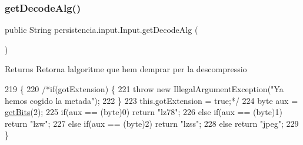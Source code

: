 \mbox{\label{classpersistencia_1_1input_1_1Input_a95e2068bd17e415f0487f8193f066160}} 
\subsubsection{\texorpdfstring{get\+Decode\+Alg()}{getDecodeAlg()}}
{\footnotesize\ttfamily public String persistencia.\+input.\+Input.\+get\+Decode\+Alg (\begin{DoxyParamCaption}{ }\end{DoxyParamCaption})\hspace{0.3cm}{\ttfamily [inline]}}

\begin{DoxyReturn}{Returns}
Retorna l\textquotesingle{}algoritme que hem d\textquotesingle{}emprar per la descompressio 
\end{DoxyReturn}

\begin{DoxyCode}
219     \{
220         \textcolor{comment}{/*if(gotExtension) \{}
221 \textcolor{comment}{            throw new IllegalArgumentException("Ya hemos cogido la metada");}
222 \textcolor{comment}{        \}}
223 \textcolor{comment}{        this.gotExtension = true;*/}
224         byte aux = \hyperlink{classpersistencia_1_1input_1_1Input_a3fa5a378b2155a3022a4a4ef38d63a8e}{getBits}(2);
225         \textcolor{keywordflow}{if}(aux == (byte)0) \textcolor{keywordflow}{return} \textcolor{stringliteral}{"lz78"};
226         \textcolor{keywordflow}{else} \textcolor{keywordflow}{if}(aux == (byte)1) \textcolor{keywordflow}{return} \textcolor{stringliteral}{"lzw"};
227         \textcolor{keywordflow}{else} \textcolor{keywordflow}{if}(aux == (byte)2) \textcolor{keywordflow}{return} \textcolor{stringliteral}{"lzss"};
228         \textcolor{keywordflow}{else} \textcolor{keywordflow}{return} \textcolor{stringliteral}{"jpeg"};
229     \}
\end{DoxyCode}
\mbox{\label{classpersistencia_1_1input_1_1Input_aa45459b94e501548a7b223d24b560ad0}} 
